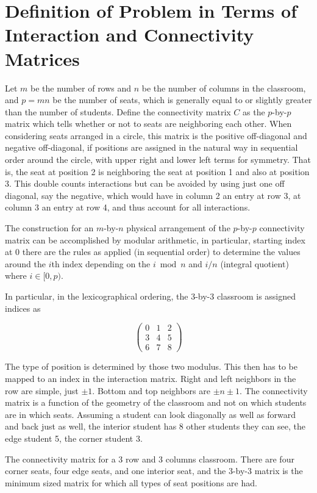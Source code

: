 \documentclass{article}
\begin{document}
\section{Definition of Problem in Terms of Interaction and Connectivity Matrices}

Let $m$ be the number of rows and $n$ be the number of columns in the classroom, and $p = mn$ be the number of seats, which is generally equal to or slightly greater than the number of students. Define the connectivity matrix $C$ as the $p$-by-$p$ matrix which tells whether or not to seats are neighboring each other. When considering seats arranged in a circle, this matrix is the positive off-diagonal and negative off-diagonal, if positions are assigned in the natural way in sequential order around the circle, with upper right and lower left terms for symmetry. That is, the seat at position 2 is neighboring the seat at position 1 and also at position 3. This double counts interactions but can be avoided by using just one off diagonal, say the negative, which would have in column 2 an entry at row 3, at column 3 an entry at row 4, and thus account for all interactions.

The construction for an $m$-by-$n$ physical arrangement of the $p$-by-$p$ connectivity matrix can be accomplished by modular arithmetic, in particular, starting index at $0$ there are the rules as applied (in sequential order) to determine the values around the $i$th index depending on the $i \bmod n$ and $i/n$ (integral quotient) where $i \in [0, p)$.

In particular, in the lexicographical ordering, the 3-by-3 classroom is assigned indices as

$$\begin{pmatrix} 
0 & 1 & 2 \\ 
3 & 4 & 5 \\ 
6 & 7 & 8 
\end{pmatrix}$$

The type of position is determined by those two modulus. This then has to be mapped to an index in the interaction matrix. Right and left neighbors in the row are simple, just $\pm 1$. Bottom and top neighbors are $\pm n \pm 1$.
The connectivity matrix is a function of the geometry of the classroom and not on which students are in which seats. Assuming a student can look diagonally as well as forward and back just as well, the interior student has 8 other students they can see, the edge student 5, the corner student 3.


\begin{table}[!h]
    \caption{The connectivity matrix for a 3 row and 3 columns classroom. There are four corner seats, four edge seats, and one interior seat, and the 3-by-3 matrix is the minimum sized matrix for which all types of seat positions are had.}
\centering

\end{table}
\end{document}
